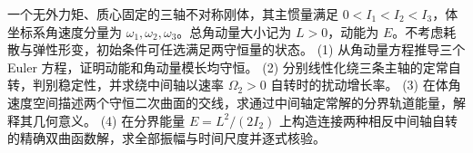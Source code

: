 一个无外力矩、质心固定的三轴不对称刚体，其主惯量满足 \(0<I_1<I_2<I_3\)，体坐标系角速度分量为 \(\omega_1,\omega_2,\omega_3\)。总角动量大小记为 \(L>0\)，动能为 \(E\)。不考虑耗散与弹性形变，初始条件可任选满足两守恒量的状态。
(1) 从角动量方程推导三个 Euler 方程，证明动能和角动量模长均守恒。
(2) 分别线性化绕三条主轴的定常自转，判别稳定性，并求绕中间轴以速率 \(\Omega_2>0\) 自转时的扰动增长率。
(3) 在体角速度空间描述两个守恒二次曲面的交线，求通过中间轴定常解的分界轨道能量，解释其几何意义。
(4) 在分界能量 \(E=L^2/(2I_2)\) 上构造连接两种相反中间轴自转的精确双曲函数解，求全部振幅与时间尺度并逐式核验。
